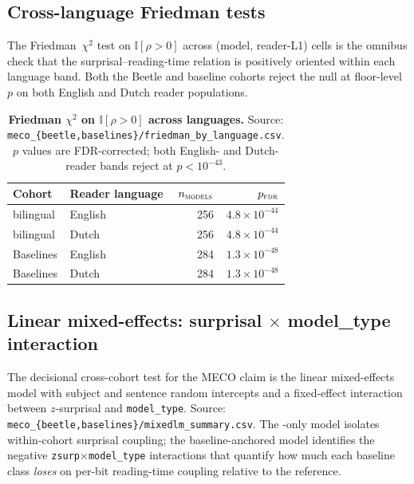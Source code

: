 \subsection{Cross-language Friedman tests}\label{sec:sig-friedman}

The Friedman~$\chi^2$ test on $\mathbb{I}[\rho > 0]$ across (model, reader-L1) cells is the omnibus check that the surprisal--reading-time relation is positively oriented within each language band. Both the Beetle and baseline cohorts reject the null at floor-level $p$ on both English and Dutch reader populations.

\begin{table}[!ht]
  \centering
  \small
  \caption{\textbf{Friedman $\chi^2$ on $\mathbb{I}[\rho > 0]$ across languages.} Source: \texttt{meco\_\{beetle,baselines\}/friedman\_by\_language.csv}. $p$ values are FDR-corrected; both English- and Dutch-reader bands reject at $p < 10^{-43}$.}
  \label{tab:sig_friedman}
  \begin{tabular}{llrr}
    \toprule
    Cohort & Reader language & $n_\textsc{models}$ & $p_\textsc{fdr}$ \\
    \midrule
    \beetle{} bilingual & English & 256 & $4.8{\times}10^{-44}$ \\
    \beetle{} bilingual & Dutch   & 256 & $4.8{\times}10^{-44}$ \\
    Baselines           & English & 284 & $1.3{\times}10^{-48}$ \\
    Baselines           & Dutch   & 284 & $1.3{\times}10^{-48}$ \\
    \bottomrule
  \end{tabular}
\end{table}

\subsection{Linear mixed-effects: surprisal $\times$ model\_type interaction}\label{sec:sig-mixedlm}

The decisional cross-cohort test for the MECO claim is the linear mixed-effects model with subject and sentence random intercepts and a fixed-effect interaction between $z$-surprisal and \texttt{model\_type}. Source: \texttt{meco\_\{beetle,baselines\}/mixedlm\_summary.csv}. The \beetle{}-only model isolates within-cohort surprisal coupling; the baseline-anchored model identifies the negative \texttt{zsurp}$\times$\texttt{model\_type} interactions that quantify how much each baseline class \emph{loses} on per-bit reading-time coupling relative to the \beetle{} reference.

